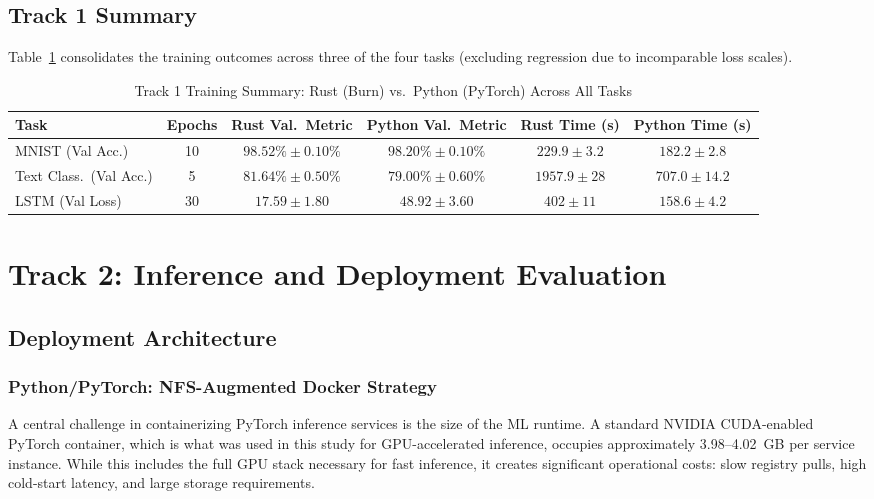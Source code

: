 \documentclass{ieeeaccess}
\begin{document}
\FloatBarrier

\subsection{Track 1 Summary}

Table~\ref{tab:track1_summary} consolidates the training outcomes across three of the four tasks (excluding regression due to incomparable loss scales).

\begin{table}[t]
\centering
\caption{Track 1 Training Summary: Rust (Burn) vs.\ Python (PyTorch) Across All Tasks}
\label{tab:track1_summary}
\begin{tabular}{|l|c|c|c|c|c|}
\hline
\textbf{Task} & \textbf{Epochs} & \textbf{Rust Val.\ Metric} & \textbf{Python Val.\ Metric} & \textbf{Rust Time (s)} & \textbf{Python Time (s)} \\
\hline
MNIST (Val Acc.)         & 10  & $98.52\%{\pm}0.10\%$    & $98.20\%{\pm}0.10\%$    & $229.9{\pm}3.2$  & $182.2{\pm}2.8$  \\
Text Class.\ (Val Acc.)  & 5   & $81.64\%{\pm}0.50\%$   & $79.00\%{\pm}0.60\%$   & $1957.9{\pm}28$  & $707.0{\pm}14.2$ \\
LSTM (Val Loss)          & 30  & $17.59{\pm}1.80$        & $48.92{\pm}3.60$        & $402{\pm}11$     & $158.6{\pm}4.2$  \\
\hline
\end{tabular}
\end{table}

\FloatBarrier

\section{Track 2: Inference and Deployment Evaluation}
\label{sec:track2}

\subsection{Deployment Architecture}

\subsubsection{Python/PyTorch: NFS-Augmented Docker Strategy}

A central challenge in containerizing PyTorch inference services is the size of the ML runtime. A standard NVIDIA CUDA-enabled PyTorch container, which is what was used in this study for GPU-accelerated inference, occupies approximately 3.98--4.02~GB per service instance. While this includes the full GPU stack necessary for fast inference, it creates significant operational costs: slow registry pulls, high cold-start latency, and large storage requirements.
\end{document}
